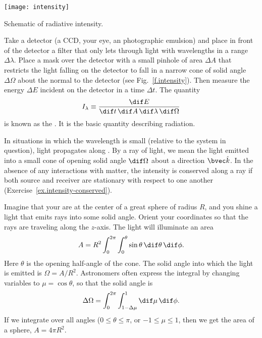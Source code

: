 \begin{marginfigure}[6\baselineskip]
\texttt{[image: intensity]}
\caption{\label{f.intensity} Schematic of radiative intensity.}
\end{marginfigure}
Take a detector (a CCD, your eye, an photographic emulsion) and place in front of the detector a filter that only lets through light with wavelengths in a range $\Delta\lambda$. Place a mask over the detector with a small pinhole of area $\Delta A$ that restricts the light falling on the detector to fall in a narrow cone of solid angle $\Delta\Omega$ about the normal to the detector (see Fig.~\ref{f.intensity}). Then measure the energy $\Delta E$ incident on the detector in a time $\Delta t$. The quantity
\begin{equation}\label{e.definition-intensity}
I_{\lambda} \equiv \frac{\dif E}{\dif t\,\dif A\,\dif\lambda\,\dif\Omega}
\end{equation}
is known as the . It is the basic quantity describing radiation.

In situations in which the wavelength is small (relative to the system in question), light propagates along . By a ray of light, we mean the light emitted into a small cone of opening solid angle $\dif\Omega$ about a direction $\unitk$. In the absence of any interactions with matter, the intensity is conserved along a ray if both source and receiver are stationary with respect to one another (Exercise~\ref{ex.intensity-conserved}).

\begin{sidebar}
\label{sb.solid-angles}
Imagine that your are at the center of a great sphere of radius $R$, and you shine a light that emits rays into some solid angle. Orient your coordinates so that the rays are traveling along the $z$-axis. The light will illuminate an area
\[ 	A = R^{2}\int_{0}^{2\pi}\int_{0}^{\theta}\sin\theta\,\dif\theta\,\dif\phi. \]
Here $\theta$ is the opening half-angle of the cone. The solid angle into which the light is emitted is $\Omega = A/R^{2}$. Astronomers often express the integral by changing variables to $\mu = \cos\theta$, so that the solid angle is
\[
	\Delta\Omega = \int_{0}^{2\pi}\int_{1-\Delta\mu}^{1}\dif\mu\,\dif\phi.
\]
If we integrate over all angles ($0\le\theta\le\pi$, or $-1\le\mu\le 1$, then we get the area of a sphere, $A = 4\pi R^{2}$.
\end{sidebar}

